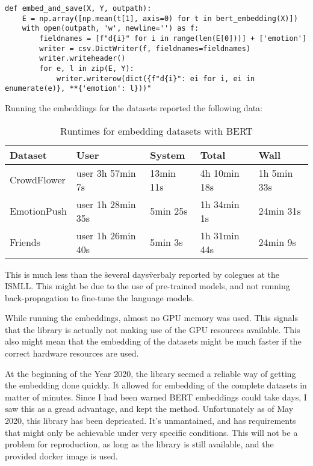 \begin{lstlisting}[caption={Embedding with BERT},label=lst:embed_bert,frame=single]
def embed_and_save(X, Y, outpath):
    E = np.array([np.mean(t[1], axis=0) for t in bert_embedding(X)])
    with open(outpath, 'w', newline='') as f:
        fieldnames = [f"d{i}" for i in range(len(E[0]))] + ['emotion']
        writer = csv.DictWriter(f, fieldnames=fieldnames)
        writer.writeheader()
        for e, l in zip(E, Y):
            writer.writerow(dict({f"d{i}": ei for i, ei in enumerate(e)}, **{'emotion': l}))"
\end{lstlisting}

Running the embeddings for the datasets reported the following data:

\begin{table}[H]
  \begin{tabular}{lllll}
  Dataset                          & User              & System    & Total        & Wall        \\
  \hline
  \multicolumn{1}{l|}{CrowdFlower} & user 3h 57min 7s  & 13min 11s & 4h 10min 18s & 1h 5min 33s \\
  \multicolumn{1}{l|}{EmotionPush} & user 1h 28min 35s & 5min 25s  & 1h 34min 1s &  24min 31s   \\
  \multicolumn{1}{l|}{Friends    } & user 1h 26min 40s & 5min 3s   & 1h 31min 44s & 24min 9s
  \end{tabular}
  \caption{Runtimes for embedding datasets with BERT}\label{tab:rt_BERT}
\end{table}

This is much less than the \"several days\" verbaly reported by colegues at the ISMLL. This might be due to the use of pre-trained models, and not running back-propagation to fine-tune the language models.

While running the embeddings, almost no GPU memory was used. This signals that the library is actually not making use of the GPU resources available. This also might mean that the embedding of the datasets might be much faster if the correct hardware resources are used.

At the beginning of the Year 2020, the library seemed a reliable way of getting the embedding done quickly. It allowed for embedding of the complete datasets in matter of minutes. Since I had been warned BERT embeddings could take days, I saw this as a gread advantage, and kept the method. Unfortunately as of May 2020, this library has been depricated. It's unmantained, and has requirements that might only be achievable under very specific conditions. This will not be a problem for reproduction, as long as the library is still available, and the provided docker image is used.

